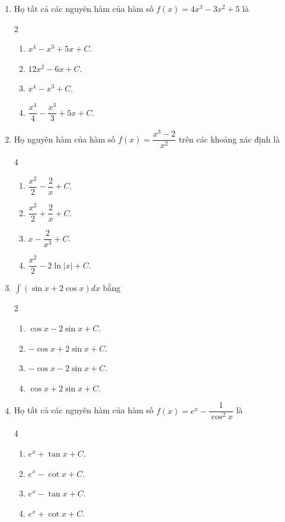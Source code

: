 \documentclass[12pt]{article}
\begin{document}
\begin{enumerate}[label=\textbf{Câu \arabic*.}]
		\item Họ tất cả các nguyên hàm của hàm số $f(x) = 4x^3 - 3x^2 + 5$ là
		\begin{multicols}{2}
			\begin{enumerate}[label=\textbf{\Alph*.}]
				\item $x^4 - x^3 + 5x + C$.
				\item $12x^2 - 6x + C$.
				\item $x^4 - x^3 + C$.
				\item $\dfrac{x^4}{4} - \dfrac{x^3}{3} + 5x + C$.
			\end{enumerate}
		\end{multicols}
		
		\item Họ nguyên hàm của hàm số $f(x) = \dfrac{x^3 - 2}{x^2}$ trên các khoảng xác định là
		\begin{multicols}{4}
			\begin{enumerate}[label=\textbf{\Alph*.}]
				\item $\dfrac{x^2}{2} - \dfrac{2}{x} + C$.
				\item $\dfrac{x^2}{2} + \dfrac{2}{x} + C$.
				\item $x - \dfrac{2}{x^3} + C$.
				\item $\dfrac{x^2}{2} - 2\ln|x| + C$.
			\end{enumerate}
		\end{multicols}
		
		\item $\displaystyle \int (\sin x + 2\cos x) dx$ bằng
		\begin{multicols}{2}
			\begin{enumerate}[label=\textbf{\Alph*.}]
				\item $\cos x - 2\sin x + C$.
				\item $-\cos x + 2\sin x + C$.
				\item $-\cos x - 2\sin x + C$.
				\item $\cos x + 2\sin x + C$.
			\end{enumerate}
		\end{multicols}
		
		\item Họ tất cả các nguyên hàm của hàm số $f(x) = e^x - \dfrac{1}{\cos^2 x}$ là
		\begin{multicols}{4}
			\begin{enumerate}[label=\textbf{\Alph*.}]
				\item $e^x + \tan x + C$.
				\item $e^x - \cot x + C$.
				\item $e^x - \tan x + C$.
				\item $e^x + \cot x + C$.
			\end{enumerate}
		\end{multicols}
		

\end{enumerate}
\end{document}
